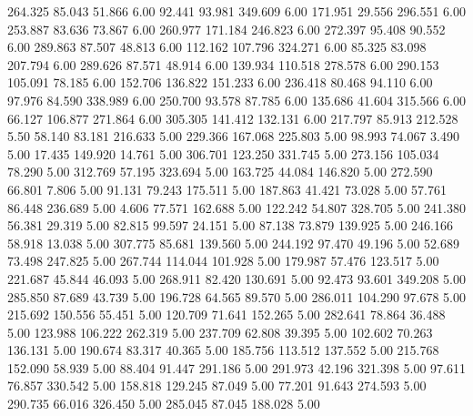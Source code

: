  264.325   85.043   51.866         6.00
  92.441   93.981  349.609         6.00
 171.951   29.556  296.551         6.00
 253.887   83.636   73.867         6.00
 260.977  171.184  246.823         6.00
 272.397   95.408   90.552         6.00
 289.863   87.507   48.813         6.00
 112.162  107.796  324.271         6.00
  85.325   83.098  207.794         6.00
 289.626   87.571   48.914         6.00
 139.934  110.518  278.578         6.00
 290.153  105.091   78.185         6.00
 152.706  136.822  151.233         6.00
 236.418   80.468   94.110         6.00
  97.976   84.590  338.989         6.00
 250.700   93.578   87.785         6.00
 135.686   41.604  315.566         6.00
  66.127  106.877  271.864         6.00
 305.305  141.412  132.131         6.00
 217.797   85.913  212.528         5.50
  58.140   83.181  216.633         5.00
 229.366  167.068  225.803         5.00
  98.993   74.067    3.490         5.00
  17.435  149.920   14.761         5.00
 306.701  123.250  331.745         5.00
 273.156  105.034   78.290         5.00
 312.769   57.195  323.694         5.00
 163.725   44.084  146.820         5.00
 272.590   66.801    7.806         5.00
  91.131   79.243  175.511         5.00
 187.863   41.421   73.028         5.00
  57.761   86.448  236.689         5.00
   4.606   77.571  162.688         5.00
 122.242   54.807  328.705         5.00
 241.380   56.381   29.319         5.00
  82.815   99.597   24.151         5.00
  87.138   73.879  139.925         5.00
 246.166   58.918   13.038         5.00
 307.775   85.681  139.560         5.00
 244.192   97.470   49.196         5.00
  52.689   73.498  247.825         5.00
 267.744  114.044  101.928         5.00
 179.987   57.476  123.517         5.00
 221.687   45.844   46.093         5.00
 268.911   82.420  130.691         5.00
  92.473   93.601  349.208         5.00
 285.850   87.689   43.739         5.00
 196.728   64.565   89.570         5.00
 286.011  104.290   97.678         5.00
 215.692  150.556   55.451         5.00
 120.709   71.641  152.265         5.00
 282.641   78.864   36.488         5.00
 123.988  106.222  262.319         5.00
 237.709   62.808   39.395         5.00
 102.602   70.263  136.131         5.00
 190.674   83.317   40.365         5.00
 185.756  113.512  137.552         5.00
 215.768  152.090   58.939         5.00
  88.404   91.447  291.186         5.00
 291.973   42.196  321.398         5.00
  97.611   76.857  330.542         5.00
 158.818  129.245   87.049         5.00
  77.201   91.643  274.593         5.00
 290.735   66.016  326.450         5.00
 285.045   87.045  188.028         5.00
